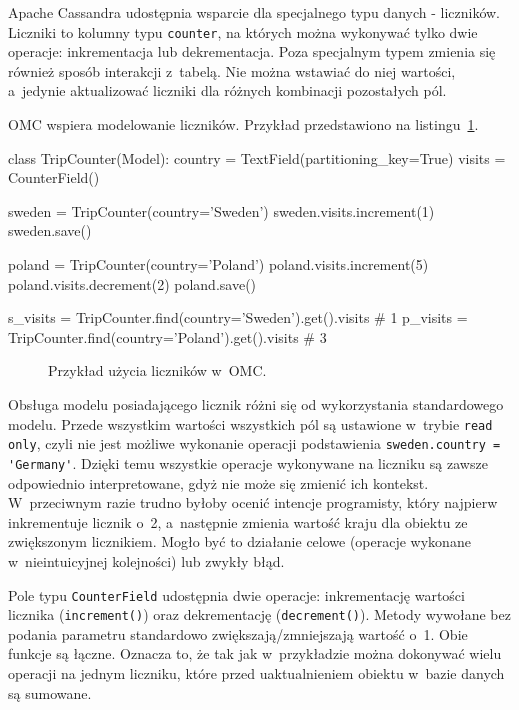 Apache Cassandra udostępnia wsparcie dla specjalnego typu danych - liczników.~\cite{cassandra_counters} Liczniki to kolumny typu \verb+counter+, na których można wykonywać tylko dwie operacje: inkrementacja lub dekrementacja. Poza specjalnym typem zmienia się również sposób interakcji z~tabelą. Nie można wstawiać do niej wartości, a~jedynie aktualizować liczniki dla różnych kombinacji pozostałych pól. 

OMC wspiera modelowanie liczników. Przykład przedstawiono na listingu~\ref{lst:ocm_counter_support}.

\begin{verbbox}[\footnotesize]
class TripCounter(Model):
    country = TextField(partitioning_key=True)
    visits = CounterField()

sweden = TripCounter(country='Sweden')
sweden.visits.increment(1)
sweden.save()

poland = TripCounter(country='Poland')
poland.visits.increment(5)
poland.visits.decrement(2)
poland.save()

s_visits = TripCounter.find(country='Sweden').get().visits    # 1
p_visits = TripCounter.find(country='Poland').get().visits    # 3
\end{verbbox}

\begin{figure}[ht!]
	\centering
	\theverbbox
	\caption{Przykład użycia liczników w~OMC.}
	\label{lst:ocm_counter_support}
\end{figure}

Obsługa modelu posiadającego licznik różni się od wykorzystania standardowego modelu. Przede wszystkim wartości wszystkich pól są ustawione w~trybie \verb+read only+, czyli nie jest możliwe wykonanie operacji podstawienia \verb+sweden.country = 'Germany'+. Dzięki temu wszystkie operacje wykonywane na liczniku są zawsze odpowiednio interpretowane, gdyż nie może się zmienić ich kontekst. W~przeciwnym razie trudno byłoby ocenić intencje programisty, który najpierw inkrementuje licznik o~2, a~następnie zmienia wartość kraju dla obiektu ze zwiększonym licznikiem. Mogło być to działanie celowe (operacje wykonane w~nieintuicyjnej kolejności) lub zwykły błąd. 

Pole typu \verb+CounterField+ udostępnia dwie operacje: inkrementację wartości licznika (\verb+increment()+) oraz dekrementację (\verb+decrement()+). Metody wywołane bez podania parametru standardowo zwiększają/zmniejszają wartość o~1. Obie funkcje są łączne. Oznacza to, że tak jak w~przykładzie można dokonywać wielu operacji na jednym liczniku, które przed uaktualnieniem obiektu w~bazie danych są sumowane.

